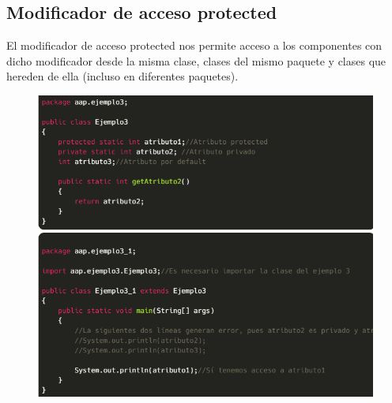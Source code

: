 \documentclass[12pt,a4paper]{report}
\begin{document}
{\subsection*{Modificador de acceso protected}
El modificador de acceso protected nos permite acceso a los componentes con dicho modificador desde la misma clase, clases del mismo paquete y clases que hereden de ella (incluso en diferentes paquetes). 
\begin{figure}[hbtp]
\centering
\includegraphics[scale=0.5]{4.PNG}
\end{figure}

}
\end{document}
